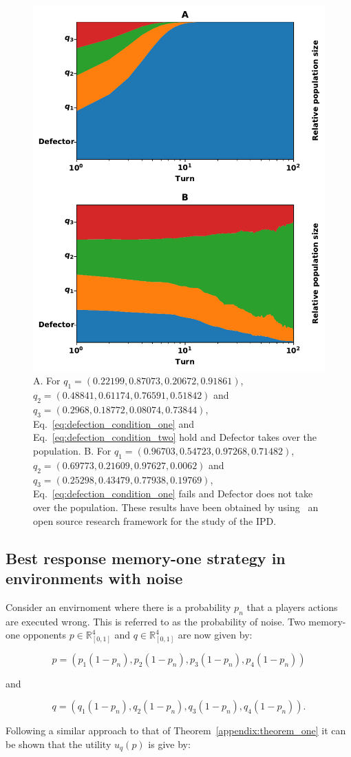 \documentclass[10pt]{article}
\newcommand{\R}{\mathbb{R}}
\begin{document}
\begin{figure}[!htbp]
    \centering
    \includegraphics[width=.4\linewidth]{img/stability_of_defection_plots.pdf}
    \caption{A. For \(q_{1}=(0.22199, 0.87073, 0.20672, 0.91861)\),
    $q_{2}=(0.48841, 0.61174, 0.76591, 0.51842)$ and
    $q_{3}=(0.2968, 0.18772, 0.08074, 0.73844)$, Eq.~\ref{eq:defection_condition_one} and
    Eq.~\ref{eq:defection_condition_two} hold and Defector takes over the
    population. B. For $q_{1}=(0.96703, 0.54723, 0.97268, 0.71482)$,
    $q_{2}=(0.69773, 0.21609, 0.97627, 0.0062)$ and
    $q_{3}=(0.25298, 0.43479, 0.77938, 0.19769)$, Eq.~\ref{eq:defection_condition_one} fails
    and Defector does not take over the population.
    These results have been obtained by using~\cite{axelrodproject} an open
    source research framework for the study of the IPD.}\label{fig:stability_of_defection}
\end{figure}

\subsection{Best response memory-one strategy in environments with noise}\label{appendix:noise}

Consider an envirnoment where there is a probability \(p_n\) that a players actions are
executed wrong. This is referred to as the probability of noise.
Two memory-one opponents \(p \in \R_{[0, 1]} ^ 4\) and \(q \in \R_{[0, 1]} ^ 4\)
are now given by:

\[p = (p_1 (1 - p_n), p_2 (1 - p_n), p_3 (1 - p_n), p_4 (1 - p_n))\]

and 

\[q = (q_1 (1 - p_n), q_2 (1 - p_n), q_3 (1 - p_n), q_4 (1 - p_n)).\]

Following a similar approach to that of Theorem~\ref{appendix:theorem_one} it
can be shown that the utility \(u_q(p)\) is give by:
\end{document}
